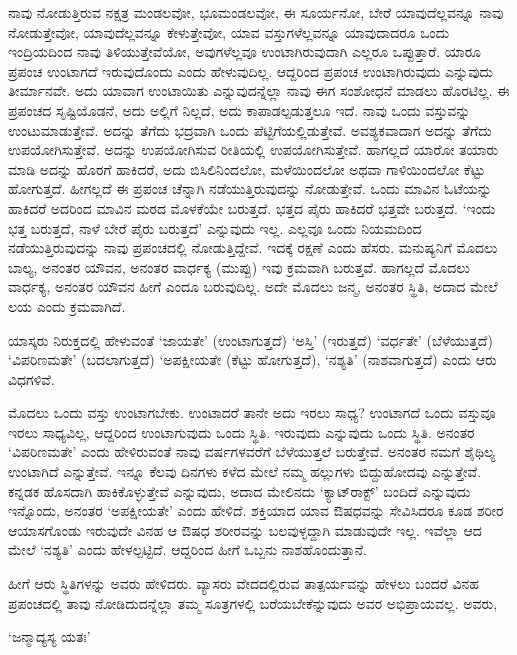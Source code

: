 ನಾವು ನೋಡುತ್ತಿರುವ ನಕ್ಷತ್ರ ಮಂಡಲವೋ, ಭೂಮಂಡಲವೋ, ಈ ಸೂರ್ಯನೋ, ಬೇರೆ ಯಾವುದೆಲ್ಲವನ್ನೂ ನಾವು ನೋಡುತ್ತೇವೋ, ಯಾವುದೆಲ್ಲವನ್ನೂ ಕೇಳುತ್ತೇವೋ, ಯಾವ ವಸ್ತುಗಳೆಲ್ಲವನ್ನೂ ಯಾವುದಾದರೂ ಒಂದು ಇಂದ್ರಿಯದಿಂದ ನಾವು ತಿಳಿಯುತ್ತೇವೆಯೋ, ಅವುಗಳೆಲ್ಲವೂ ಉಂಟಾಗಿರುವುದಾಗಿ ಎಲ್ಲರೂ ಒಪ್ಪುತ್ತಾರೆ. ಯಾರೂ ಪ್ರಪಂಚ ಉಂಟಾಗದೆ ಇರುವುದೊಂದು ಎಂದು ಹೇಳುವುದಿಲ್ಲ. ಆದ್ದರಿಂದ ಪ್ರಪಂಚ ಉಂಟಾಗಿರುವುದು ಎನ್ನುವುದು ತೀರ್ಮಾನವೇ. ಅದು ಯಾವಾಗ ಉಂಟಾಯಿತು ಎನ್ನುವುದನ್ನೆಲ್ಲಾ ನಾವು ಈಗ ಸಂಶೋಧನೆ ಮಾಡಲು ಹೊರಟಿಲ್ಲ. ಈ ಪ್ರಪಂಚದ ಸೃಷ್ಟಿಯೊಡನೆ, ಅದು ಅಲ್ಲಿಗೆ ನಿಲ್ಲದೆ, ಅದು ಕಾಪಾಡಲ್ಪಡುತ್ತಲೂ ಇದೆ. ನಾವು ಒಂದು ವಸ್ತುವನ್ನು ಉಂಟುಮಾಡುತ್ತೇವೆ. ಅದನ್ನು ತೆಗೆದು ಭದ್ರವಾಗಿ ಒಂದು ಪೆಟ್ಟಿಗೆಯಲ್ಲಿಡುತ್ತೇವೆ. ಅವಶ್ಯಕವಾದಾಗ ಅದನ್ನು ತೆಗೆದು ಉಪಯೋಗಿಸುತ್ತೇವೆ. ಅದನ್ನು ಉಪಯೋಗಿಸುವ ರೀತಿಯಲ್ಲಿ ಉಪಯೋಗಿಸುತ್ತೇವೆ. ಹಾಗಲ್ಲದೆ ಯಾರೋ ತಯಾರು ಮಾಡಿ ಅದನ್ನು ಹೊರಗೆ ಹಾಕಿದರೆ, ಅದು ಬಿಸಿಲಿನಿಂದಲೋ, ಮಳೆಯಿಂದಲೋ ಅಥವಾ ಗಾಳಿಯಿಂದಲೋ ಕೆಟ್ಟು ಹೋಗುತ್ತದೆ. ಹೀಗಲ್ಲದೆ ಈ ಪ್ರಪಂಚ ಚೆನ್ನಾಗಿ ನಡೆಯುತ್ತಿರುವುದನ್ನು ನೋಡುತ್ತೇವೆ. ಒಂದು ಮಾವಿನ ಓಟೆಯನ್ನು ಹಾಕಿದರೆ ಅದರಿಂದ ಮಾವಿನ ಮರದ ಮೊಳಕೆಯೇ ಬರುತ್ತದೆ. ಭತ್ತದ ಪೈರು ಹಾಕಿದರೆ ಭತ್ತವೇ ಬರುತ್ತದೆ. `ಇಂದು ಭತ್ತ ಬರುತ್ತದೆ, ನಾಳೆ ಬೇರೆ ಪೈರು ಬರುತ್ತದೆ' ಎನ್ನುವುದು ಇಲ್ಲ. ಎಲ್ಲವೂ ಒಂದು ನಿಯಮದಿಂದ ನಡೆಯುತ್ತಿರುವುದನ್ನು ನಾವು ಪ್ರಪಂಚದಲ್ಲಿ ನೋಡುತ್ತಿದ್ದೇವೆ. ಇದಕ್ಕೆ ರಕ್ಷಣೆ ಎಂದು ಹೆಸರು. ಮನುಷ್ಯನಿಗೆ ಮೊದಲು ಬಾಲ್ಯ, ಅನಂತರ ಯೌವನ, ಅನಂತರ ವಾರ್ಧಕ್ಯ (ಮುಪ್ಪು) ಇವು ಕ್ರಮವಾಗಿ ಬರುತ್ತವೆ. ಹಾಗಲ್ಲದೆ ಮೊದಲು ವಾರ್ಧಕ್ಯ, ಅನಂತರ ಯೌವನ ಹೀಗೆ ಎಂದೂ ಬರುವುದಿಲ್ಲ. ಅದೇ ಮೊದಲು ಜನ್ಮ, ಅನಂತರ ಸ್ಥಿತಿ, ಅದಾದ ಮೇಲೆ ಲಯ ಎಂದು ಕ್ರಮವಾಗಿದೆ.

ಯಾಸ್ಕರು ನಿರುಕ್ತದಲ್ಲಿ ಹೇಳುವಂತೆ `ಜಾಯತೇ' (ಉಂಟಾಗುತ್ತದೆ) `ಅಸ್ತಿ' (ಇರುತ್ತದೆ) `ವರ್ಧತೇ' (ಬೆಳೆಯುತ್ತದೆ) `ವಿಪರಿಣಮತೇ' (ಬದಲಾಗುತ್ತದೆ) `ಅಪಕ್ಷೀಯತೇ (ಕೆಟ್ಟು ಹೋಗುತ್ತದೆ), `ನಶ್ಯತಿ' (ನಾಶವಾಗುತ್ತದೆ) ಎಂದು ಆರು ವಿಧಗಳಿವೆ.

ಮೊದಲು ಒಂದು ವಸ್ತು ಉಂಟಾಗಬೇಕು. ಉಂಟಾದರೆ ತಾನೇ ಅದು ಇರಲು ಸಾಧ್ಯ? ಉಂಟಾಗದೆ ಒಂದು ವಸ್ತುವೂ ಇರಲು ಸಾಧ್ಯವಿಲ್ಲ, ಆದ್ದರಿಂದ ಉಂಟಾಗುವುದು ಒಂದು ಸ್ಥಿತಿ. ಇರುವುದು ಎನ್ನುವುದು ಒಂದು ಸ್ಥಿತಿ. ಅನಂತರ `ವಿಪರಿಣಮತೇ' ಎಂದು ಹೇಳಿರುವಂತೆ ನಾವು {} ವರ್ಷಗಳವರೆಗೆ ಬೆಳೆಯುತ್ತಲೆ ಬರುತ್ತೇವೆ. ಅನಂತರ ನಮಗೆ ಶೈಥಿಲ್ಯ ಉಂಟಾಗಿದೆ ಎನ್ನುತ್ತೇವೆ. ಇನ್ನೂ ಕೆಲವು ದಿನಗಳು ಕಳೆದ ಮೇಲೆ ನಮ್ಮ ಹಲ್ಲುಗಳು ಬಿದ್ದುಹೋದವು ಎನ್ನುತ್ತೇವೆ. ಕನ್ನಡಕ ಹೊಸದಾಗಿ ಹಾಕಿಕೊಳ್ಳುತ್ತೇವೆ ಎನ್ನುವುದು, ಅದಾದ ಮೇಲಿನದು `ಕ್ಯಾಟ್‌ರಾಕ್ಟ್' ಬಂದಿದೆ ಎನ್ನುವುದು ಇನ್ನೊಂದು, ಅನಂತರ `ಅಪಕ್ಷೀಯತೇ' ಎಂದು ಹೇಳಿದೆ. ಶಕ್ತಿಯಾದ ಯಾವ ಔಷಧವನ್ನು ಸೇವಿಸಿದರೂ ಕೂಡ ಶರೀರ ಆಯಾಸಗೊಂಡು ಇರುವುದೇ ವಿನಹ ಆ ಔಷಧ ಶರೀರವನ್ನು ಬಲವುಳ್ಳದ್ದಾಗಿ ಮಾಡುವುದೇ ಇಲ್ಲ. ಇವೆಲ್ಲಾ ಆದ ಮೇಲೆ `ನಶ್ಯತಿ' ಎಂದು ಹೇಳಲ್ಪಟ್ಟಿದೆ. ಆದ್ದರಿಂದ ಹೀಗೆ ಒಬ್ಬನು ನಾಶಹೊಂದುತ್ತಾನೆ.


ಹೀಗೆ ಆರು ಸ್ಥಿತಿಗಳನ್ನು ಅವರು ಹೇಳಿದರು. ವ್ಯಾಸರು ವೇದದಲ್ಲಿರುವ ತಾತ್ಪರ್ಯವನ್ನು ಹೇಳಲು ಬಂದರೆ ವಿನಹ ಪ್ರಪಂಚದಲ್ಲಿ ತಾವು ನೋಡಿದುದನ್ನೆಲ್ಲಾ ತಮ್ಮ ಸೂತ್ರಗಳಲ್ಲಿ ಬರೆಯಬೇಕೆನ್ನುವುದು ಅವರ ಅಭಿಪ್ರಾಯವಲ್ಲ. ಅವರು,


\begin{shloka}
`ಜನ್ಮಾದ್ಯಸ್ಯ ಯತಃ'
\end{shloka}

